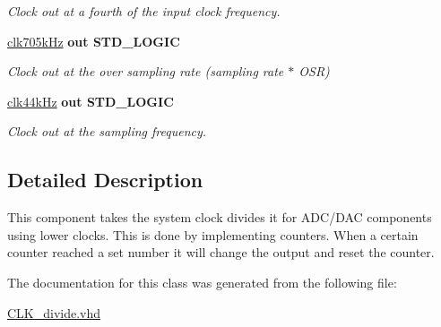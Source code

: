 \begin{DoxyCompactItemize}
\begin{DoxyCompactList}\small\item\em Clock out at a fourth of the input clock frequency. \end{DoxyCompactList}\item 
\hypertarget{classclk__divide_aff53844dd015a736d734149d187ffa1d}{\hyperlink{classclk__divide_aff53844dd015a736d734149d187ffa1d}{clk705k\-Hz}  {\bfseries {\bfseries \textcolor{vhdlkeyword}{out}\textcolor{vhdlchar}{ }}} {\bfseries \textcolor{comment}{S\-T\-D\-\_\-\-L\-O\-G\-I\-C}\textcolor{vhdlchar}{ }} }\label{classclk__divide_aff53844dd015a736d734149d187ffa1d}

\begin{DoxyCompactList}\small\item\em Clock out at the over sampling rate (sampling rate $\ast$ O\-S\-R) \end{DoxyCompactList}\item 
\hypertarget{classclk__divide_ab41cd6e2d38ae8f4a3b6bc0891225629}{\hyperlink{classclk__divide_ab41cd6e2d38ae8f4a3b6bc0891225629}{clk44k\-Hz}  {\bfseries {\bfseries \textcolor{vhdlkeyword}{out}\textcolor{vhdlchar}{ }}} {\bfseries \textcolor{comment}{S\-T\-D\-\_\-\-L\-O\-G\-I\-C}\textcolor{vhdlchar}{ }} }\label{classclk__divide_ab41cd6e2d38ae8f4a3b6bc0891225629}

\begin{DoxyCompactList}\small\item\em Clock out at the sampling frequency. \end{DoxyCompactList}\end{DoxyCompactItemize}


\subsection{Detailed Description}
This component takes the system clock divides it for A\-D\-C/\-D\-A\-C components using lower clocks. This is done by implementing counters. When a certain counter reached a set number it will change the output and reset the counter. 

The documentation for this class was generated from the following file\-:\begin{DoxyCompactItemize}
\item 
\hyperlink{CLK__divide_8vhd}{C\-L\-K\-\_\-divide.\-vhd}\end{DoxyCompactItemize}

